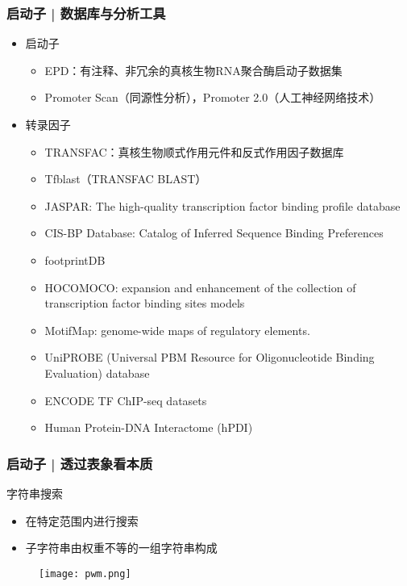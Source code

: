 \begin{frame}
  \frametitle{启动子 | 数据库与分析工具}
  \begin{itemize}
    \item 启动子
      \begin{itemize}
	\item EPD：有注释、非冗余的真核生物RNA聚合酶启动子数据集
        \item Promoter Scan（同源性分析），Promoter 2.0（人工神经网络技术）
      \end{itemize}
    \item 转录因子
      \begin{itemize}
        \item TRANSFAC：真核生物顺式作用元件和反式作用因子数据库
        \item Tfblast（TRANSFAC BLAST）
        \item JASPAR: The high-quality transcription factor binding profile database
        \item CIS-BP Database: Catalog of Inferred Sequence Binding Preferences
        \item footprintDB
        \item HOCOMOCO: expansion and enhancement of the collection of transcription factor binding sites models
        \item MotifMap: genome-wide maps of regulatory elements.
        \item UniPROBE (Universal PBM Resource for Oligonucleotide Binding Evaluation) database
        \item ENCODE TF ChIP-seq datasets
        \item Human Protein-DNA Interactome (hPDI)
      \end{itemize}
  \end{itemize}
\end{frame}

\begin{frame}
  \frametitle{启动子 | 透过表象看本质}
  \begin{block}{字符串搜索}
    \begin{itemize}
      \item 在特定范围内进行搜索
      \item 子字符串由权重不等的一组字符串构成
    \end{itemize}
  \end{block}
  \begin{figure}
    \centering
    \texttt{[image: pwm.png]}
  \end{figure}
\end{frame}

